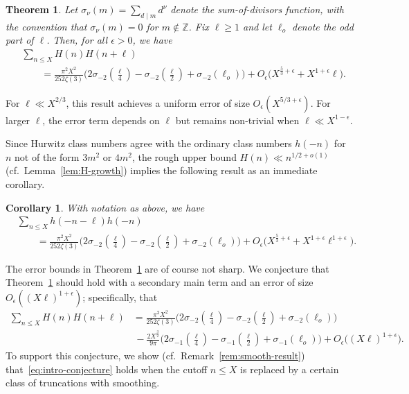 \documentclass[11pt,reqno]{amsart}
\theoremstyle{plain}
\newtheorem{theorem}{Theorem}[section]
\newtheorem*{corollary*}{Corollary}
\theoremstyle{definition}
\numberwithin{equation}{section}
\begin{document}
\begin{theorem} \label{thm:intro-main-theorem}
Let $\sigma_\nu(m) = \sum_{d \mid m} d^\nu$ denote the sum-of-divisors function, with the convention that $\sigma_\nu(m) = 0$ for $m \notin \mathbb{Z}$. Fix $\ell \geq 1$ and let $\ell_o$ denote the odd part of $\ell$. Then, for all $\epsilon > 0$, we have
\begin{align*}
	&\sum_{n \leq X} H(n) H(n+\ell) \\[-.2em]
	& \qquad 	= \frac{\pi^2 X^2}{252\zeta(3)}
				\big(2\sigma_{-2}(\tfrac{\ell}{4}) - \sigma_{-2}(\tfrac{\ell}{2})  +\sigma_{-2}(\ell_o) \big) 
	+ O_\epsilon\big(X^{\frac{5}{3}+\epsilon} 
		 + X^{1+\epsilon} \ell \big).
\end{align*}
\end{theorem}

For $\ell \ll X^{2/3}$, this result achieves a uniform error of size $O_\epsilon(X^{5/3+\epsilon})$. For larger $\ell$, the error term depends on $\ell$ but remains non-trivial when $\ell \ll X^{1-\epsilon}$.

Since Hurwitz class numbers agree with the ordinary class numbers $h(-n)$ for $n$ not of the form $3m^2$ or $4m^2$, the rough upper bound $H(n) \ll n^{1/2+o(1)}$ (cf.~Lemma~\ref{lem:H-growth}) implies the following result as an immediate corollary.

\begin{corollary*} With notation as above, we have
\begin{align*}
	& \sum_{n \leq X} \! h(-n-\ell)h(-n) \\[-.2em]
	& \qquad = \frac{\pi^2 X^2}{252\zeta(3)}
				\big(2\sigma_{-2}(\tfrac{\ell}{4}) - \sigma_{-2}(\tfrac{\ell}{2})+\sigma_{-2}(\ell_o) \big) 
	+ O_\epsilon\big(X^{\frac{5}{3}+\epsilon} + X^{1+\epsilon} \ell^{1+\epsilon} \big).
\end{align*}
\end{corollary*}

The error bounds in Theorem~\ref{thm:intro-main-theorem} are of course not sharp. We conjecture that Theorem~\ref{thm:intro-main-theorem} should hold with a secondary main term and an error of size $O_\epsilon((X\ell)^{1+\epsilon})$; specifically, that
\begin{align} \label{eq:intro-conjecture}
	\sum_{n \leq X} H(n) H(n+\ell) 
	&	= \frac{\pi^2 X^2}{252\zeta(3)}
				\big(2\sigma_{-2}(\tfrac{\ell}{4}) - \sigma_{-2}(\tfrac{\ell}{2})  +\sigma_{-2}(\ell_o) \big) \\
	& \,
		- \frac{2X^{\frac{3}{2}}}{9\pi}
				\big(2 \sigma_{-1}(\tfrac{\ell}{4}) - \sigma_{-1}(\tfrac{\ell}{2}) + \sigma_{-1}(\ell_o) \big)
		+ O_\epsilon\big((X\ell)^{1+\epsilon} \big).
\end{align}
To support this conjecture, we show (cf.~Remark~\ref{rem:smooth-result}) that~\eqref{eq:intro-conjecture} holds when the cutoff $n \leq X$ is replaced by a certain class of truncations with smoothing.
\end{document}
